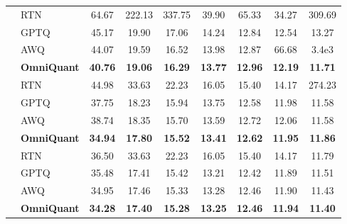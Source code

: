 \documentclass{article} %
\begin{document}
\begin{table}[!ht]
\begin{tabular}{llccccccc}
         \hline
         & RTN & 64.67  & 222.13 & 337.75 & 39.90 & 65.33 & 34.27 & 309.69  \\
         & GPTQ & 45.17  & 19.90 & 17.06 & 14.24 & 12.84 & 12.54 & 13.27 \\
         & AWQ & 44.07  & 19.59 & 16.52 & 13.98 & 12.87 & 66.68 & 3.4e3   \\
         & \textbf{OmniQuant}  & \textbf{40.76} & \textbf{19.06} & \textbf{16.29} & \textbf{13.77} & \textbf{12.96} & \textbf{12.19} & \textbf{11.71}  \\
         \hline
          & RTN & 44.98  & 33.63 & 22.23 & 16.05 & 15.40 & 14.17 & 274.23  \\
         & GPTQ & 37.75  & 18.23 & 15.94 & 13.75 & 12.58 & 11.98 & 11.58 \\
         & AWQ & 38.74  & 18.35 & 15.70 & 13.59 & 12.72 & 12.06 & 11.58   \\
         & \textbf{OmniQuant}  & \textbf{34.94} & \textbf{17.80} & \textbf{15.52} & \textbf{13.41} & \textbf{12.62} & \textbf{11.95} & \textbf{11.86}  \\
         \hline
          & RTN & 36.50  & 33.63 & 22.23 & 16.05 & 15.40 & 14.17 & 11.79   \\
         & GPTQ & 35.48  & 17.41 & 15.42 & 13.21 & 12.42 & 11.89 & 11.51 \\
         & AWQ & 34.95  & 17.46 & 15.33 & 13.28 & 12.46 & 11.90 & 11.43   \\
         & \textbf{OmniQuant}  & \textbf{34.28} & \textbf{17.40} & \textbf{15.28} & \textbf{13.25} & \textbf{12.46} & \textbf{11.94} & \textbf{11.40}  \\
        \hline
    \end{tabular}
    \label{tab:opt_weight_only_ptb}
\end{table}
\end{document}
